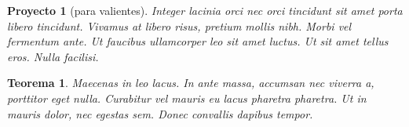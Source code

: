 \documentclass[11pt,a4paper]{report}
\newtheorem{Teorema}[definicion]{Teorema}}
\newtheorem{Proyecto}[Ejemplo]{Proyecto}}
\begin{document}
\begin{Proyecto}[para valientes]
Integer lacinia orci nec orci tincidunt sit amet porta libero tincidunt. Vivamus at libero risus, pretium mollis nibh. Morbi vel fermentum ante. Ut faucibus ullamcorper leo sit amet luctus. Ut sit amet tellus eros. Nulla facilisi. 
\end{Proyecto}




\begin{Teorema}
Maecenas in leo lacus. In ante massa, accumsan nec viverra a, porttitor eget nulla. Curabitur vel mauris eu lacus pharetra pharetra. Ut in mauris dolor, nec egestas sem. Donec convallis dapibus tempor. 

\end{Teorema}






\end{document}

